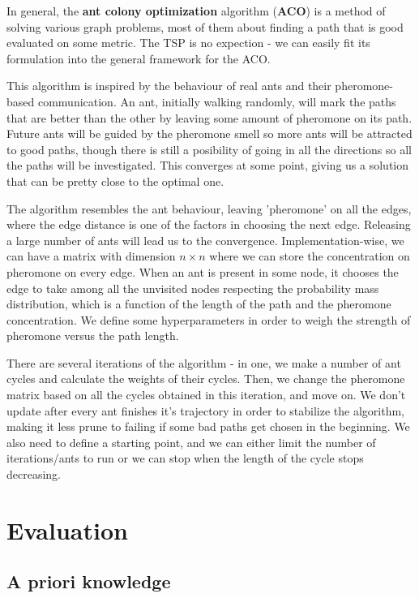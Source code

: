 \documentclass[12pt,twoside,notitlepage]{report}
\begin{document}
In general, the {\bf ant colony optimization} algorithm ({\bf ACO}) is a method of solving various graph problems, most of them about finding a path that is good evaluated on some metric. The TSP is no expection - we can easily fit its formulation into the general framework for the ACO.

This algorithm is inspired by the behaviour of real ants and their pheromone-based communication. An ant, initially walking randomly, will mark the paths that are better than the other by leaving some amount of pheromone on its path. Future ants will be guided by the pheromone smell so more ants will be attracted to good paths, though there is still a posibility of going in all the directions so all the paths will be investigated. This converges at some point, giving us a solution that can be pretty close to the optimal one.

The algorithm resembles the ant behaviour, leaving 'pheromone' on all the edges, where the edge distance is one of the factors in choosing the next edge. Releasing a large number of ants will lead us to the convergence. Implementation-wise, we can have a matrix with dimension $n \times n$ where we can store the concentration on pheromone on every edge. When an ant is present in some node, it chooses the edge to take among all the unvisited nodes respecting the probability mass distribution, which is a function of the length of the path and the pheromone concentration. We define some hyperparameters in order to weigh the strength of pheromone versus the path length.

There are several iterations of the algorithm - in one, we make a number of ant cycles and calculate the weights of their cycles. Then, we change the pheromone matrix based on all the cycles obtained in this iteration, and move on. We don't update after every ant finishes it's trajectory in order to stabilize the algorithm, making it less prune to failing if some bad paths get chosen in the beginning. We also need to define a starting point, and we can either limit the number of iterations/ants to run or we can stop when the length of the cycle stops decreasing. 

\cleardoublepage
\chapter{Evaluation}

\section{A priori knowledge}
\end{document}
